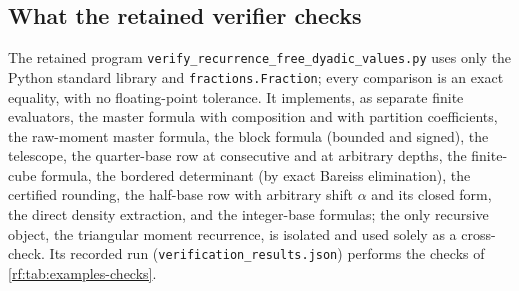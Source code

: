 \documentclass[11pt,oneside]{article}
\theoremstyle{plain}
\theoremstyle{definition}
\theoremstyle{remark}
\begin{document}
\subsection{What the retained verifier checks}
\label{rf:sec:examples-verifier}

The retained program \texttt{verify\_recurrence\_free\_dyadic\_values.py}
uses only the Python standard library and \texttt{fractions.Fraction}; every
comparison is an exact equality, with no floating-point tolerance.  It
implements, as separate finite evaluators, the master formula with
composition and with partition coefficients, the raw-moment master formula,
the block formula (bounded and signed), the telescope, the quarter-base row
at consecutive and at arbitrary depths, the finite-cube formula, the
bordered determinant (by exact Bareiss elimination), the certified rounding,
the half-base row with arbitrary shift $\alpha$ and its closed form, the
direct density extraction, and the integer-base formulas; the only
recursive object, the triangular moment recurrence, is isolated and used
solely as a cross-check.  Its recorded run (\texttt{verification\_results.json})
performs the checks of \cref{rf:tab:examples-checks}.
\end{document}
